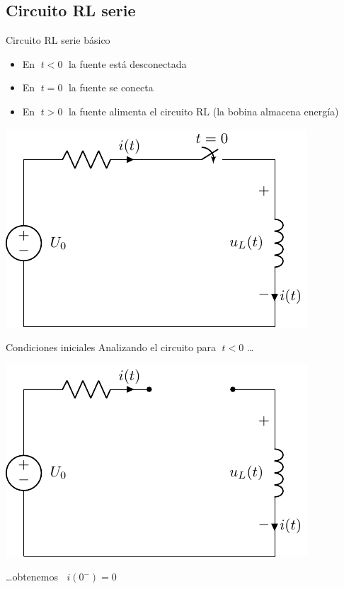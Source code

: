 \documentclass[aspectratio=169, usenames,svgnames,dvipsnames]{beamer}
\begin{document}

\subsection{Circuito RL serie}

\begin{frame}{Circuito RL serie básico}
    \vspace{3mm}
    \begin{itemize}
        \item En \(\; t < 0 \;\) la fuente está desconectada
        \item En \(\; t = 0 \;\) la fuente se conecta
        \item En \(\; t > 0 \;\) la fuente alimenta el circuito RL (la bobina almacena energía)
    \end{itemize}

    \begin{center}
        \includegraphics[height=0.6\textheight]{../figs/transitorio_circuitoRL.pdf}
    \end{center}
\end{frame}


\begin{frame}{Condiciones iniciales} \label{diapo:CondicionInicialRL}
    Analizando el circuito para \(\; t < 0\) \ldots{}
    \begin{center}
        \includegraphics[height=0.57\textheight]{../figs/transitorio_circuitoRL_t0-.pdf}
    \end{center}
    \ldots{}obtenemos \( \;\boxed{\; i(0^-) = 0 \;}\)  
\end{frame}
\end{document}
